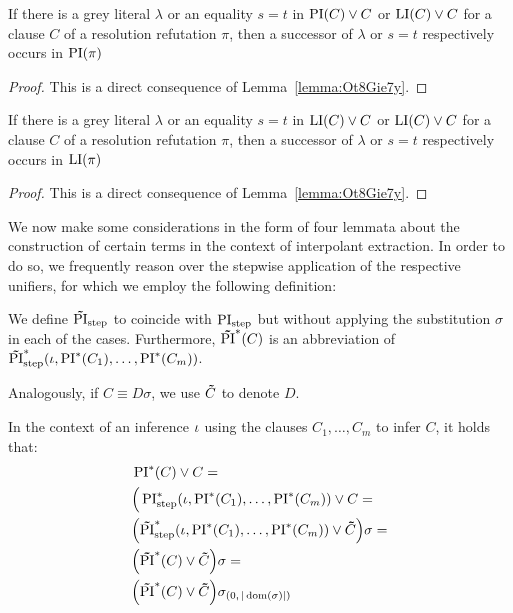 \documentclass[%
	draft=false,%
	numbers=noendperiod,%
	11pt,%
	a4paper,%
	oneside,%
	openany,%
]{memoir}
\begin{document}
\begin{corr}
	\label{lemma:grey_lits_and_eq_all_in_PI}
	If there is a grey literal $\lambda$ or an equality $s=t$ in $\operatorname{PI}(C) \lor C$ or $\operatorname{LI}(C) \lor C$ for a clause $C$ of a resolution refutation $\pi$,
	then a successor of $\lambda$ or $s=t$ respectively occurs in $\operatorname{PI}(\pi)$ 
\end{corr}
\begin{proof}
	This is a direct consequence of Lemma~\ref{lemma:Ot8Gie7y}.
\end{proof}

\begin{corr}
	\label{lemma:grey_lits_and_eq_all_in_LI}
	If there is a grey literal $\lambda$ or an equality $s=t$ in $\operatorname{LI}(C) \lor C$ or $\operatorname{LI}(C) \lor C$ for a clause $C$ of a resolution refutation $\pi$,
	then a successor of $\lambda$ or $s=t$ respectively occurs in $\operatorname{LI}(\pi)$ 
\end{corr}
\begin{proof}
	This is a direct consequence of Lemma~\ref{lemma:Ot8Gie7y}.
\end{proof}




We now make some considerations in the form of four lemmata about the construction of certain terms in the context of interpolant extraction.
In order to do so, we frequently reason over the stepwise application of the respective unifiers, for which we employ the following definition:

\begin{defi}
	We define $\bm\tilde{\operatorname{PI}}_{\mathrm{step}}$ to coincide with $\operatorname{PI}_{\mathrm{step}}$ but without applying the substitution $\sigma$ in each of the cases.
	Furthermore, $\bm\tilde{\operatorname{PI}}^{*}(C)$ is an abbreviation of $\bm\tilde{\operatorname{PI}}^{*}_{\mathrm{step}}(\iota, \operatorname{PI}^*(C_1), \dots, \operatorname{PI}^*(C_m))$.

	Analogously, if $C \equiv D\sigma$, we use $\bm\tilde{C}$ to denote\nolinebreak{} $D$.
\end{defi}

In the context of an inference $\iota$ using the clauses $C_1, \dots, C_m$ to infer $C$, it holds that:
\begin{align*}
	& \operatorname{PI}^*(C) \lor C = \\
	& \Big(\operatorname{PI}_{\mathrm{step}}^*(\iota, \operatorname{PI}^*(C_1), \dots, \operatorname{PI}^*(C_m)) \lor C = \\
	& \Big(\bm\tilde{\operatorname{PI}}^{*}_{\mathrm{step}}(\iota, \operatorname{PI}^*(C_1), \dots, \operatorname{PI}^*(C_m)) \lor \bm\tilde{C} \Big) \sigma = \\
	& \Big(\bm\tilde{\operatorname{PI}}^{*}(C)\lor \bm\tilde{C} \Big) \sigma = \\
	& \Big(\bm\tilde{\operatorname{PI}}^{*}(C)\lor \bm\tilde{C} \Big) \sigma_{(0,\,|\operatorname{dom}(\sigma)|)}
\end{align*}
\end{document}
